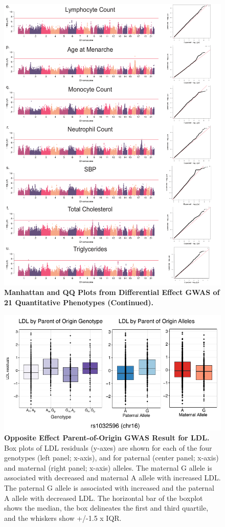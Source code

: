 \begin{figure}[!htb]
	\ContinuedFloat
	\centering
	\includegraphics[width=5in]{img/ch02/fig-s7c.pdf}
	\caption[]{\textbf{Manhattan and QQ Plots from Differential Effect GWAS of 21 Quantitative Phenotypes (Continued).} }
	\label{fig:fig-s7c}
\end{figure}


\begin{figure}[!htb]
\centering
\includegraphics[width=5in]{img/ch02/fig-s8.pdf}
\caption[Opposite Effect Parent-of-Origin GWAS Result for LDL.]{\textbf{Opposite Effect Parent-of-Origin GWAS Result for LDL.}  Box plots of LDL residuals (y-axes) are shown for each of the four genotypes (left panel; x-axis), and for paternal (center panel; x-axis) and maternal (right panel; x-axis) alleles. The maternal G allele is associated with decreased and maternal A allele with increased LDL. The paternal G allele is associated with increased and the paternal A allele with decreased LDL. The horizontal bar of the boxplot shows the median, the box delineates the first and third quartile, and the whiskers show +/-1.5 x IQR.}
\label{fig:fig-s8}
\end{figure}

